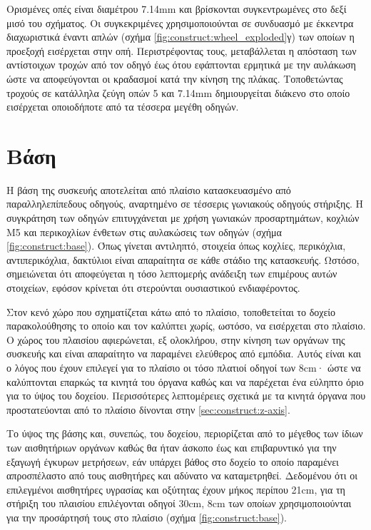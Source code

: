 Ορισμένες οπές είναι διαμέτρου 7.14mm και βρίσκονται συγκεντρωμένες στο δεξί
μισό του σχήματος.
Οι συγκεκριμένες χρησιμοποιούνται σε συνδυασμό με έκκεντρα διαχωριστικά έναντι
απλών (σχήμα \ref{fig:construct:wheel_exploded}γ) των οποίων η προεξοχή
εισέρχεται στην οπή. Περιστρέφοντας τους, μεταβάλλεται η απόσταση των
αντίστοιχων τροχών από τον οδηγό έως ότου εφάπτονται ερμητικά με την αυλάκωση
ώστε να αποφεύγονται οι κραδασμοί κατά την κίνηση της πλάκας.
Τοποθετώντας τροχούς σε κατάλληλα ζεύγη οπών 5 και 7.14mm δημιουργείται διάκενο
στο οποίο εισέρχεται οποιοδήποτε από τα τέσσερα μεγέθη οδηγών.


\section{Βάση}

\label{sec:construct:base}
Η βάση της συσκευής αποτελείται από πλαίσιο κατασκευασμένο από παραλληλεπίπεδους
οδηγούς, αναρτημένο σε τέσσερις γωνιακούς οδηγούς στήριξης. Η συγκράτηση των
οδηγών επιτυγχάνεται με χρήση γωνιακών προσαρτημάτων, κοχλιών M5 και περικοχλίων
ένθετων στις αυλακώσεις των οδηγών (σχήμα \ref{fig:construct:base}). Όπως
γίνεται αντιληπτό, στοιχεία όπως κοχλίες, περικόχλια, αντιπερικόχλια, δακτύλιοι
\etc είναι απαραίτητα σε κάθε στάδιο της κατασκευής. Ωστόσο, σημειώνεται ότι
αποφεύγεται η τόσο λεπτομερής ανάδειξη των επιμέρους αυτών στοιχείων, εφόσον
κρίνεται ότι στερούνται ουσιαστικού ενδιαφέροντος.

Στον κενό χώρο που σχηματίζεται κάτω από το πλαίσιο, τοποθετείται το δοχείο
παρακολούθησης το οποίο και τον καλύπτει χωρίς, ωστόσο, να εισέρχεται στο
πλαίσιο. Ο χώρος του πλαισίου αφιερώνεται, εξ ολοκλήρου, στην κίνηση των οργάνων
της συσκευής και είναι απαραίτητο να παραμένει ελεύθερος από εμπόδια. Αυτός
είναι και ο λόγος που έχουν επιλεγεί για το πλαίσιο οι τόσο πλατιοί οδηγοί των
8cm· ώστε να καλύπτονται επαρκώς τα κινητά του όργανα καθώς και να παρέχεται ένα
εύληπτο όριο για το ύψος του δοχείου. Περισσότερες λεπτομέρειες σχετικά με τα
κινητά όργανα που προστατεύονται από το πλαίσιο δίνονται στην
\ref{sec:construct:z-axis}.

Το ύψος της βάσης και, συνεπώς, του δοχείου, περιορίζεται από το μέγεθος των
ίδιων των αισθητήριων οργάνων καθώς θα ήταν άσκοπο έως και επιβαρυντικό για την
εξαγωγή έγκυρων μετρήσεων, εάν υπάρχει βάθος στο δοχείο το οποίο παραμένει
απροσπέλαστο από τους αισθητήρες και αδύνατο να καταμετρηθεί.
Δεδομένου ότι οι επιλεγμένοι αισθητήρες υγρασίας και οξύτητας έχουν μήκος
περίπου 21cm, για τη στήριξη του πλαισίου επιλέγονται οδηγοί 30cm, 8cm των
οποίων χρησιμοποιούνται για την προσάρτησή τους στο πλαίσιο (σχήμα
\ref{fig:construct:base}).

